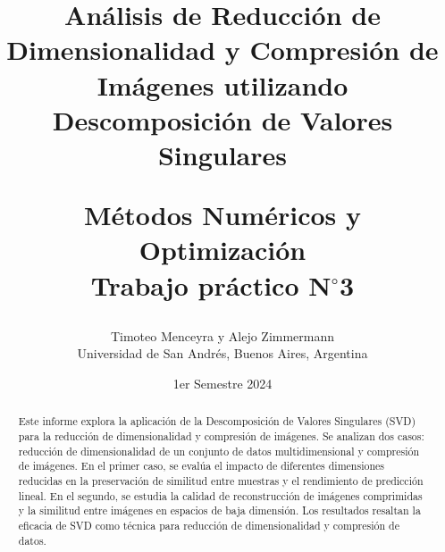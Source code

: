 \documentclass[12pt,a4]{article} %
\title{Análisis de Reducción de Dimensionalidad y Compresión de Imágenes utilizando Descomposición de Valores Singulares\\


\vspace{20mm}

 Métodos Numéricos y Optimización\\
 Trabajo práctico N$^{\circ}$3\\
}
\author{Timoteo Menceyra y Alejo Zimmermann\\ [2mm] %
\small Universidad de San Andrés, Buenos Aires, Argentina}
\date{1er Semestre 2024}
\begin{document}
\vspace{1cm} %



\maketitle


\begin{abstract}
Este informe explora la aplicación de la Descomposición de Valores Singulares (SVD) para la reducción de dimensionalidad y compresión de imágenes. Se analizan dos casos: reducción de dimensionalidad de un conjunto de datos multidimensional y compresión de imágenes. En el primer caso, se evalúa el impacto de diferentes dimensiones reducidas en la preservación de similitud entre muestras y el rendimiento de predicción lineal. En el segundo, se estudia la calidad de reconstrucción de imágenes comprimidas y la similitud entre imágenes en espacios de baja dimensión. Los resultados resaltan la eficacia de SVD como técnica para reducción de dimensionalidad y compresión de datos.\\
\vspace{2mm}
\end{abstract}


\raggedcolumns
\end{document}
